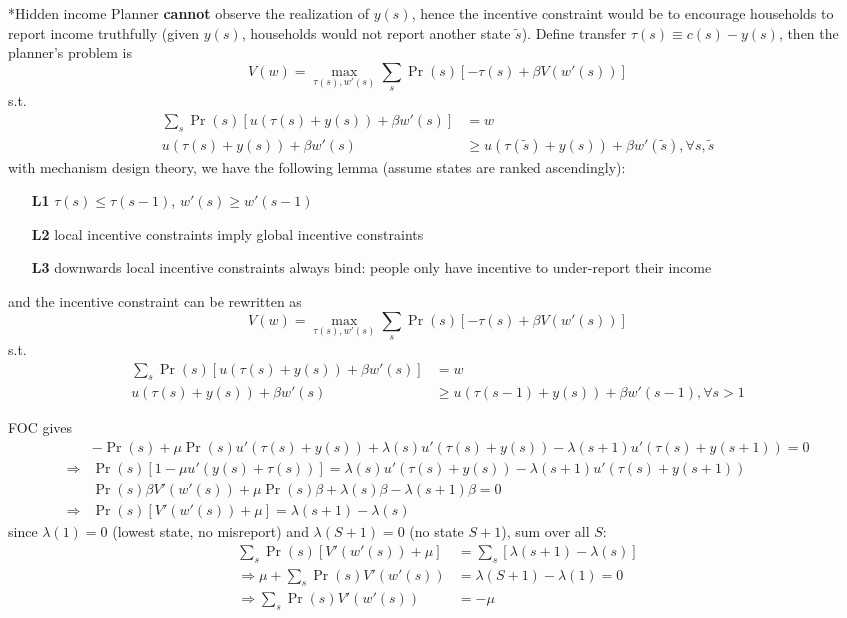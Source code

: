 \documentclass[10pt,landscape,a4paper]{article}
\makeatletter
\renewcommand{\subsubsection}{\@startsection{subsubsection}{1}{0mm}{.2ex}{.2ex}{\bfseries}}
\makeatother
\begin{document}
\begin{multicols*}{3}
\subsubsection*{Hidden income}
Planner \textbf{cannot} observe the realization of $y(s)$, hence the incentive constraint would be to encourage households to report income truthfully (given $y(s)$, households would not report another state $\tilde{s}$). Define transfer $\tau(s)\equiv c(s)-y(s)$, then the planner's problem is
$$
V(w) = \max_{\tau(s),w'(s)}\sum_s \Pr(s) \left[ -\tau(s) + \beta V(w'(s)) \right]
$$
s.t.
\begin{align*}
    \sum_s \Pr(s)\left[ u(\tau(s)+y(s))+\beta w'(s) \right] &= w \\
    u(\tau(s)+y(s)) + \beta w'(s) &\geq u(\tau(\tilde{s})+y(s)) + \beta w'(\tilde{s}), \forall s,\tilde{s}
\end{align*}
with mechanism design theory, we have the following lemma (assume states are ranked ascendingly):
\begin{itemize}
    \item[\textbf{L1}] $\tau(s)\leq \tau(s-1)$, $w'(s) \geq w'(s-1)$
    \item[\textbf{L2}] local incentive constraints imply global incentive constraints
    \item[\textbf{L3}] downwards local incentive constraints always bind: people only have incentive to under-report their income
\end{itemize}
and the incentive constraint can be rewritten as
$$
V(w) = \max_{\tau(s),w'(s)}\sum_s \Pr(s) \left[ -\tau(s) + \beta V(w'(s)) \right]
$$
s.t.
\begin{align*}
    \sum_s \Pr(s)\left[ u(\tau(s)+y(s))+\beta w'(s) \right] &= w \\
    u(\tau(s)+y(s)) + \beta w'(s) &\geq u(\tau(s-1)+y(s)) + \beta w'(s-1), \forall s>1
\end{align*}

FOC gives
\begin{align*}
    &-\Pr(s) + \mu\Pr(s)u'(\tau(s)+y(s)) + \lambda(s)u'(\tau(s)+y(s)) -\lambda(s+1)u'(\tau(s)+y(s+1))= 0 \\
    \Rightarrow & \Pr(s)\left[1-\mu u'(y(s)+\tau(s))\right] = \lambda(s)u'(\tau(s)+y(s)) -\lambda(s+1)u'(\tau(s)+y(s+1)) \\
    &\Pr(s)\beta V'(w'(s)) + \mu\Pr(s)\beta +\lambda(s)\beta -\lambda(s+1)\beta= 0 \\ \Rightarrow& \Pr(s)\left[V'(w'(s))+\mu\right] = \lambda(s+1)-\lambda(s)
\end{align*}
since $\lambda(1)=0$ (lowest state, no misreport) and $\lambda(S+1)=0$ (no state $S+1$), sum over all $S$:
\begin{align*}
    \sum_s \Pr(s)\left[V'(w'(s))+\mu\right] &= \sum_s \left[\lambda(s+1)-\lambda(s)\right]\\
    \Rightarrow \mu + \sum_s\Pr(s)V'(w'(s)) &= \lambda(S+1)-\lambda(1)=0\\
    \Rightarrow \sum_s\Pr(s)V'(w'(s)) &= -\mu
\end{align*}


\end{multicols*}
\end{document}
